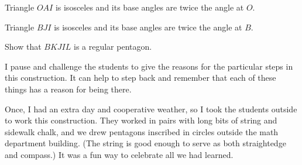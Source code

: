 \begin{conjecture}\label{conj:pentagon-1}
Triangle $OAI$ is isosceles and its base angles are twice the angle at $O$.
\end{conjecture}

\begin{conjecture}\label{conj:pentagon-2}
Triangle $BJI$ is isosceles and its base angles are twice the angle at $B$.
\end{conjecture}

\begin{conjecture}\label{conj:pentagon-3}
Show that $BKJIL$ is a regular pentagon.
\end{conjecture}

\begin{annotation}
{
\color{blue}
I pause and challenge the students to give the reasons for the particular steps in this construction. It can help to step back and remember that each of these things has a reason for being there.

Once, I had an extra day and cooperative weather, so I took the students outside to work this construction. They worked in pairs with long bits of string and sidewalk chalk, and we drew pentagons inscribed in circles outside the math department building. (The string is good enough to serve as both straightedge and compass.) It was a fun way to celebrate all we had learned.
}
\end{annotation}



\backmatter

\begin{annotation}

\end{annotation}


